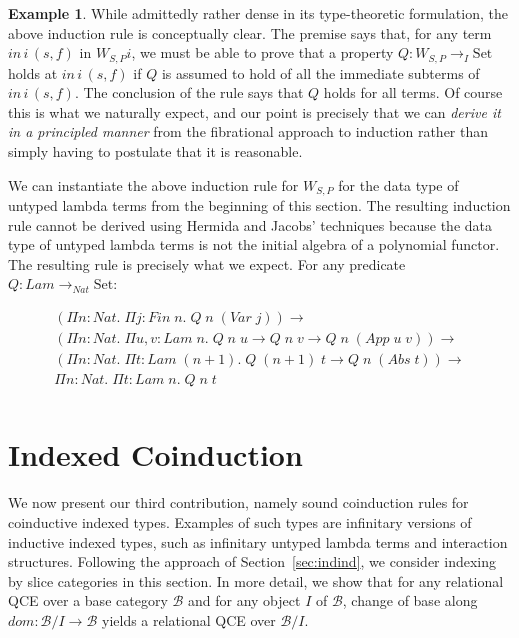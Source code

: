 \documentclass{LMCS}
\newcommand{\ra}{\rightarrow}
\newcommand{\Set}{\mbox{Set}}
\newcommand\B{{\mathcal B}}
\newcommand\Lam{\mathit{Lam}}
\newcommand\Fin{\mathit{Fin}}
\newcommand\Nat{\mathit{Nat}}
\theoremstyle{plain}
\theoremstyle{remark}
\theoremstyle{definition}
\newtheorem{example}[theorem]{Example}
\begin{document}
\begin{example}
\vspace*{0.15in}

While admittedly rather dense in its type-theoretic formulation, the
above induction rule is conceptually clear. The premise says that, for
any term $\mathit{in}\,i\,(s,f)$ in $W_{S,P}i$, we must be able to
prove that a property $Q:W_{S,P} \ra_I \Set$ holds at
$\mathit{in}\,i\,(s,f)$ if $Q$ is assumed to hold of all the immediate
subterms of $\mathit{in}\,i\,(s,f)$. The conclusion of the rule says
that $Q$ holds for all terms. Of course this is what we naturally
expect, and our point is precisely that we can {\em derive it in a
  principled manner} from the fibrational approach to induction rather
than simply having to postulate that it is reasonable.

We can instantiate the above induction rule for $W_{S,P}$ for the data
type of untyped lambda terms from the beginning of this section. The
resulting induction rule cannot be derived using Hermida and Jacobs'
techniques because the data type of untyped lambda terms is not the
initial algebra of a polynomial functor. The resulting rule is
precisely what we expect. For any predicate $Q:\Lam \ra_{\Nat} \Set$:

\[\begin{array}{l}
(\Pi n :\Nat. \; \Pi j : \Fin \; n. \; Q \; n \; (Var
\; j)) \ra \\ 
(\Pi n :\Nat. \; \Pi u, v : \Lam \; n.  \; Q \; n \; u
\ra  Q \; n \; v
\rightarrow Q \; n \; (App \; u \; v)) \rightarrow\\
(\Pi n :\Nat. \; \Pi t :  \Lam \; (n\! +\! 1). \; Q \; (n\! + \! 1) \; t
\rightarrow Q \; n \; (Abs \; t)) \ra \\
\Pi n :\Nat. \; \Pi t :  \Lam \; n.  \; Q \; n \; t \\
\end{array}
\]
\end{example}

\section{Indexed Coinduction}\label{sec:indcoind}

We now present our third contribution, namely sound coinduction rules
for coinductive indexed types. Examples of such types are infinitary
versions of inductive indexed types, such as infinitary untyped lambda
terms and interaction structures. Following the approach of
Section~\ref{sec:indind}, we consider indexing by slice categories in
this section. In more detail, we show that for any relational QCE over
a base category $\B$ and for any object $I$ of $\B$, change of base
along $dom:\B/I \ra \B$ yields a relational QCE over $\B/I$.
\end{document}

